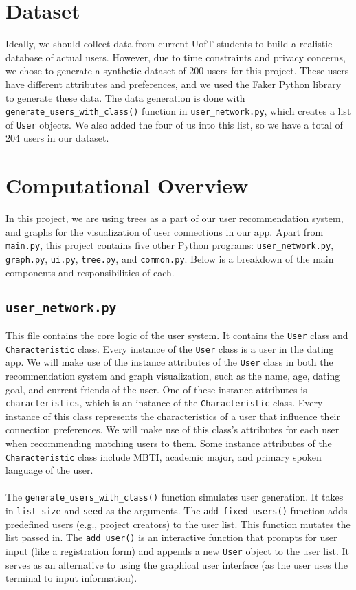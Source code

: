 \documentclass[fontsize=11pt]{article}
\begin{document}
\section{Dataset}
Ideally, we should collect data from current UofT students to build a realistic database of actual users.
However, due to time constraints and privacy concerns, we chose to generate a synthetic dataset of 200 users for this project.
These users have different attributes and preferences, and we used the Faker Python library to generate these data.
The data generation is done with \texttt{generate\_users\_with\_class()} function in \texttt{user\_network.py}, which creates a list of \texttt{User} objects.
We also added the four of us into this list, so we have a total of 204 users in our dataset.

\section{Computational Overview}
In this project, we are using trees as a part of our user recommendation system, and graphs for the visualization of user connections in our app. 
Apart from \texttt{main.py}, this project contains five other Python programs: \texttt{user\_network.py}, \texttt{graph.py}, \texttt{ui.py}, \texttt{tree.py}, and \texttt{common.py}. Below is a breakdown of the main components and responsibilities of each.

\subsection*{\texttt{user\_network.py}}
This file contains the core logic of the user system. 
It contains the \texttt{User} class and \texttt{Characteristic} class.
Every instance of the \texttt{User} class is a user in the dating app.
We will make use of the instance attributes of the \texttt{User} class in both the recommendation system and graph visualization, such as the name, age, dating goal, and current friends of the user. 
One of these instance attributes is \texttt{characteristics}, which is an instance of the \texttt{Characteristic} class. 
Every instance of this class represents the characteristics of a user that influence their connection preferences.
We will make use of this class's attributes for each user when recommending matching users to them.
Some instance attributes of the \texttt{Characteristic} class include MBTI, academic major, and primary spoken language of the user.
\\
\\
The \texttt{generate\_users\_with\_class()} function simulates user generation.
It takes in \texttt{list\_size} and \texttt{seed} as the arguments.
The \texttt{add\_fixed\_users()} function adds predefined users (e.g., project creators) to the user list. This function mutates the list passed in.
The \texttt{add\_user()} is an interactive function that prompts for user input (like a registration form) and appends a new \texttt{User} object to the user list. It serves as an alternative to using the graphical user interface (as the user uses the terminal to input information).
\end{document}
